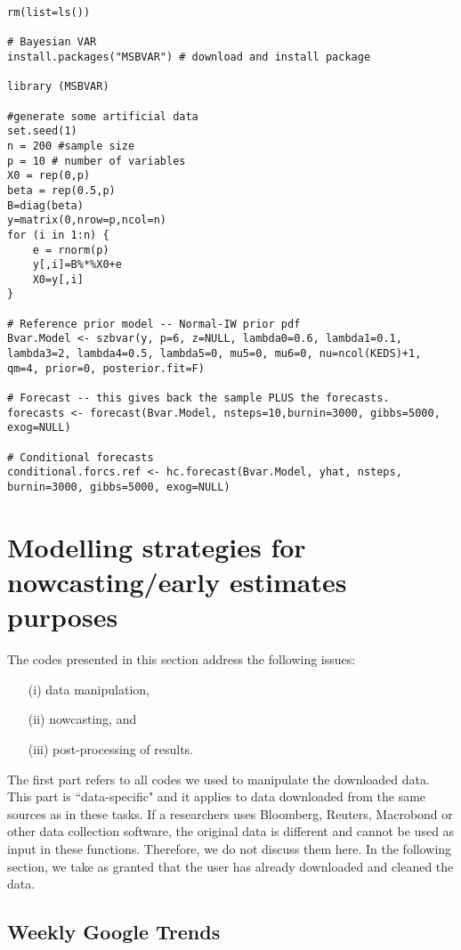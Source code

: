 \documentclass[12pt]{article}
\begin{document}
\begin{lstlisting}[title=\textbf{Bayesian VAR}]
rm(list=ls())

# Bayesian VAR
install.packages("MSBVAR") # download and install package

library (MSBVAR)

#generate some artificial data
set.seed(1)
n = 200 #sample size
p = 10 # number of variables
X0 = rep(0,p)
beta = rep(0.5,p)
B=diag(beta)
y=matrix(0,nrow=p,ncol=n)
for (i in 1:n) {
	e = rnorm(p)
	y[,i]=B%*%X0+e
	X0=y[,i]
}

# Reference prior model -- Normal-IW prior pdf
Bvar.Model <- szbvar(y, p=6, z=NULL, lambda0=0.6, lambda1=0.1, lambda3=2, lambda4=0.5, lambda5=0, mu5=0, mu6=0, nu=ncol(KEDS)+1, qm=4, prior=0, posterior.fit=F)

# Forecast -- this gives back the sample PLUS the forecasts.
forecasts <- forecast(Bvar.Model, nsteps=10,burnin=3000, gibbs=5000, exog=NULL)

# Conditional forecasts
conditional.forcs.ref <- hc.forecast(Bvar.Model, yhat, nsteps,
burnin=3000, gibbs=5000, exog=NULL)
\end{lstlisting}

\section{Modelling strategies for nowcasting/early estimates purposes}

The codes presented in this section address the following issues: 
\begin{itemize}
\item[(i)] data manipulation,
\item[(ii)] nowcasting, and 
\item[(iii)] post-processing of results.
\end{itemize}
The first part refers to all codes we used to manipulate the downloaded
data. This part is ``data-specific" and it applies to data downloaded from
the same sources as in these tasks. If a researchers uses Bloomberg,
Reuters, Macrobond or other data collection software, the original data is
different and cannot be used as input in these functions. Therefore, we do
not discuss them here. In the following section, we take as granted that the user
has already downloaded and cleaned the data.

\subsection{Weekly Google Trends \textendash{}  {\href{https://github.com/eurostat/econowcast/blob/master/nowcast/Weekly-Google.R}{}}}
\end{document}
